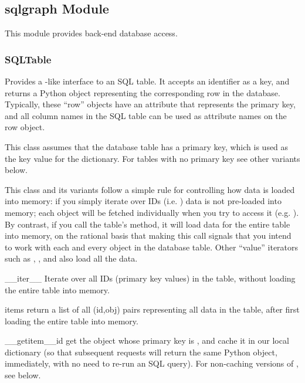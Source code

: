 \documentclass{howto}
\begin{document}
\subsection{sqlgraph Module}
\label{sqlgraph-module}
This module provides back-end database access.

\subsubsection{SQLTable}
Provides a -like interface to an SQL table.  It accepts
an identifier as a key, and returns a Python object representing
the corresponding row in the database.  Typically, these ``row''
objects have an  attribute that represents the
primary key, and all column names in the SQL table can be
used as attribute names on the row object.

This class assumes that the database table has a primary key,
which is used as the key value for the dictionary.  For tables
with no primary key see other variants below.

This class and its variants follow a simple rule for controlling
how data is loaded into memory: if you simply iterate over IDs
(i.e. ) data is not pre-loaded into memory;
each object will be fetched individually when you try to access it
(e.g. ).  By contrast, if you call the table's
 method, it will load data for the entire table into
memory, on the rational basis that making this call signals that you
intend to work with each and every object in the database table.  Other
``value'' iterators such as , ,
and  also load all the data.

\begin{funcdesc}{__iter__}{}
  Iterate over all IDs (primary key values) in the table,
  without loading the entire table into memory.
\end{funcdesc}

\begin{funcdesc}{items}{}
  return a list of all (id,obj) pairs representing all data in the table,
  after first loading the entire table into memory.
\end{funcdesc}

\begin{funcdesc}{__getitem__}{id}
  get the object whose primary key is , and cache it in
  our local dictionary (so that subsequent requests will return the
  same Python object, immediately, with no need to re-run an SQL query).
  For non-caching versions of , see below.
\end{funcdesc}
\end{document}
